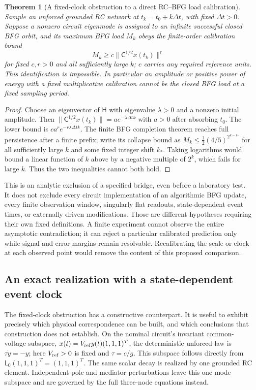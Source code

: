 \documentclass[11pt,letterpaper]{article}
\newtheorem{theorem}{Theorem}[section]
\theoremstyle{definition}
\numberwithin{equation}{section}
\begin{document}
\begin{theorem}[A fixed-clock obstruction to a direct RC--BFG load calibration]\label{rcnogo}
Sample an unforced grounded RC network at $t_k=t_0+k\Delta t$, with fixed $\Delta t>0$. Suppose a nonzero circuit eigenmode is assigned to an infinite successful closed BFG orbit, and its maximum BFG load $M_k$ obeys the finite-order calibration bound
\begin{equation}\label{rcbridgebound}
M_k\geq c\|\mathsf C^{1/2}x(t_k)\|^r
\end{equation}
for fixed $c,r>0$ and all sufficiently large $k$; $c$ carries any required reference units. This identification is impossible. In particular an amplitude or positive power of energy with a fixed multiplicative calibration cannot be the closed BFG load at a fixed sampling period.
\end{theorem}
\begin{proof}
Choose an eigenvector of $\mathsf H$ with eigenvalue $\lambda>0$ and a nonzero initial amplitude. Then $\|\mathsf C^{1/2}x(t_k)\|=a e^{-\lambda\Delta t k}$ with $a>0$ after absorbing $t_0$. The lower bound is $ca^r e^{-r\lambda\Delta t k}$. The finite BFG completion theorem reaches full persistence after a finite prefix; write its collapse bound as $M_k\leq\tfrac12(4/5)^{2^{k-k_*}}$ for all sufficiently large $k$ and some fixed integer shift $k_*$. Taking logarithms would bound a linear function of $k$ above by a negative multiple of $2^k$, which fails for large $k$. Thus the two inequalities cannot both hold.
\end{proof}
This is an analytic exclusion of a specified bridge, even before a laboratory test. It does not exclude every circuit implementation of an algorithmic BFG update, every finite observation window, singularly flat readouts, state-dependent event times, or externally driven modifications. Those are different hypotheses requiring their own fixed definitions. A finite experiment cannot observe the entire asymptotic contradiction; it can reject a particular calibrated prediction only while signal and error margins remain resolvable. Recalibrating the scale or clock at each observed point would remove the content of this proposed comparison.

\subsection{An exact realization with a state-dependent event clock}
The fixed-clock obstruction has a constructive counterpart. It is useful to exhibit precisely which physical correspondence can be built, and which conclusions that construction does not establish. On the nominal circuit's invariant common-voltage subspace, $x(t)=V_{\rm ref}y(t)(1,1,1)^T$, the deterministic unforced law is $\tau\dot y=-y$; here $V_{\rm ref}>0$ is fixed and $\tau=c/g$. This subspace follows directly from $\mathsf L_0(1,1,1)^T=(1,1,1)^T$. The same scalar decay is realized by one grounded RC element. Independent pole and mediator perturbations leave this one-mode subspace and are governed by the full three-node equations instead.
\end{document}
